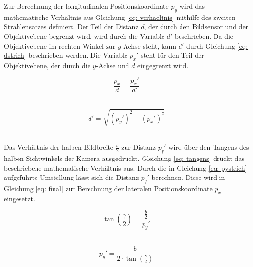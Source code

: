 		Zur Berechnung der longitudinalen Positionskoordinate $p_y$ wird das mathematische Verhältnis aus Gleichung \ref{eq: verhaeltnis} mithilfe des zweiten Strahlensatzes definiert. Der Teil der Distanz $d$, der durch den Bildsensor und der Objektivebene begrenzt wird, wird durch die Variable $d'$ beschrieben. Da die Objektivebene im rechten Winkel zur $y$-Achse steht, kann $d'$ durch Gleichung \ref{eq: dstrich} beschrieben werden. Die Variable ${p_x}'$ steht für den Teil der Objektivebene, der durch die $y$-Achse und $d$ eingegrenzt wird. \\
		
		
		\begin{figure}[H]
			\centering
			\begin{minipage}[b]{0.49\textwidth}
				\begin{equation}
					\frac{p_x}{d}=\frac{{p_x}'}{d'}
					\label{eq: verhaeltnis}
				\end{equation}\\
			\end{minipage}
			\hfill
			\begin{minipage}[b]{0.49\textwidth}
				\begin{equation}
					d'=\sqrt{({p_y}')^2+({p_x}')^2}
					\label{eq: dstrich}
				\end{equation}\\
			\end{minipage}
		\end{figure}
		
		Das Verhältnis der halben Bildbreite $\frac{b}{2}$ zur Distanz ${p_y}'$ wird über den Tangens des halben Sichtwinkels der Kamera ausgedrückt. Gleichung \ref{eq: tangens} drückt das beschriebene mathematische Verhältnis aus. Durch die in Gleichung \ref{eq: pystrich} aufgeführte Umstellung lässt sich die Distanz ${p_y}'$ berechnen. Diese wird in Gleichung \ref{eq: final} zur Berechnung der lateralen Positionskoordinate $p_x$ eingesetzt.\\
		
		\begin{figure}[H]
			\centering
			\begin{minipage}[b]{0.49\textwidth}
				\begin{equation}
					\tan\left(\frac{\gamma}{2}\right)=\frac{\frac{b}{2}}{{p_y}'}
					\label{eq: tangens}
				\end{equation}\\
			\end{minipage}
			\hfill
			\begin{minipage}[b]{0.49\textwidth}
				\begin{equation}
					{p_y}'=\frac{b}{2\cdot \tan\left(\frac{\gamma}{2}\right)}
					\label{eq: pystrich}
				\end{equation}\\
			\end{minipage}
		\end{figure}
	
